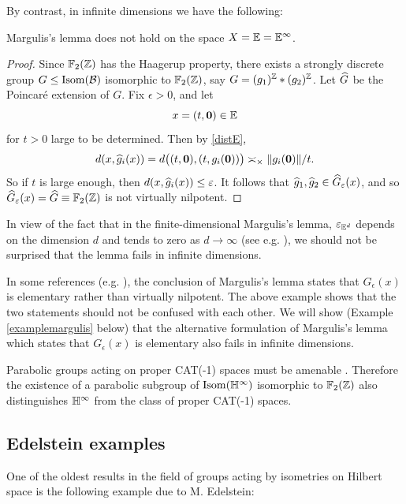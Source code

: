By contrast, in infinite dimensions we have the following:
\begin{observation}
\label{observationmargulislemma}
Margulis's lemma does not hold on the space $X = \E = \E^\infty$.
\end{observation}
\begin{proof}
Since $\F_2(\Z)$ has the Haagerup property, there exists a strongly discrete group $G\leq\operatorname{Isom}(\mathcal B)$ isomorphic to $\F_2(\Z)$, say $G = (g_1)^\Z\ast (g_2)^\Z$. Let $\widehat G$ be the Poincar\'e extension of $G$. Fix $\epsilon > 0$, and let
\[
x = (t,\0)\in\E
\]
for $t > 0$ large to be determined. Then by \eqref{distE},
\[
d(x,\widehat g_i(x)) = d\big((t,\mathbf 0), (t,g_i(\mathbf 0))\big) \asymp_\times \|g_i(\mathbf 0)\|/t.
\]
So if $t$ is large enough, then $d(x,\widehat g_i(x)) \leq \varepsilon$. It follows that $\widehat g_1,\widehat g_2\in \widehat G_\varepsilon(x)$, and so $\what G_\epsilon(x) = \what G \equiv \F_2(\Z)$ is not virtually nilpotent.
\end{proof}
\begin{remark}
In view of the fact that in the finite-dimensional Margulis's lemma, $\epsilon_{\E^d}$ depends on the dimension $d$ and tends to zero as $d\to\infty$ (see e.g. \cite[Proposition 5.2]{Belolipetsky_survey}), we should not be surprised that the lemma fails in infinite dimensions.
\end{remark}
\begin{remark}
\label{remarkmargulislemma}
In some references (e.g. \cite[Theorem 12.6.1]{Ratcliffe}), the conclusion of Margulis's lemma states that $G_\epsilon(x)$ is elementary rather than virtually nilpotent. The above example shows that the two statements should not be confused with each other. We will show (Example \ref{examplemargulis} below) that the alternative formulation of Margulis's lemma which states that $G_\epsilon(x)$ is elementary also fails in infinite dimensions.
\end{remark}

\begin{remark}
Parabolic groups acting on proper CAT(-1) spaces must be amenable \cite[Proposition 1.6]{BurgerMozes}. Therefore the existence of a parabolic subgroup of $\Isom(\H^\infty)$ isomorphic to $\F_2(\Z)$ also distinguishes $\H^\infty$ from the class of proper CAT(-1) spaces.
\end{remark}

\subsection{Edelstein examples}
\label{subsubsectionedelstein}
One of the oldest results in the field of groups acting by isometries on Hilbert space is the following example due to M. Edelstein:

